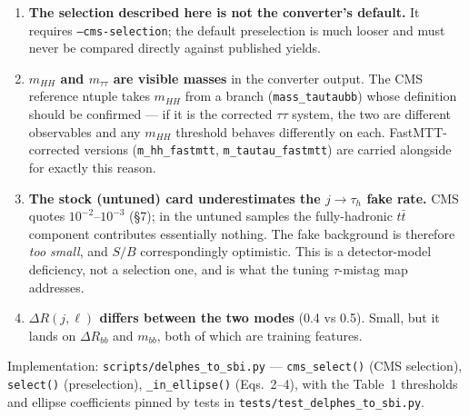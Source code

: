 \documentclass[11pt,a4paper]{article}
\newcommand{\tauh}{\tau_{h}}
\newcommand{\mtautau}{m_{\tau\tau}}
\newcommand{\mbb}{m_{bb}}
\newcommand{\mhh}{m_{HH}}
\begin{document}
\begin{enumerate}\itemsep3pt
\item \textbf{The selection described here is not the converter's default.} It requires
  \texttt{--cms-selection}; the default preselection is much looser and must never be
  compared directly against published yields.
\item \textbf{$\mhh$ and $\mtautau$ are visible masses} in the converter output. The CMS
  reference ntuple takes $\mhh$ from a branch (\texttt{mass\_tautaubb}) whose definition
  should be confirmed --- if it is the corrected $\tau\tau$ system, the two are different
  observables and any $\mhh$ threshold behaves differently on each. FastMTT-corrected
  versions (\texttt{m\_hh\_fastmtt}, \texttt{m\_tautau\_fastmtt}) are carried alongside
  for exactly this reason.
\item \textbf{The stock (untuned) card underestimates the $j\rightarrow\tauh$ fake rate.}
  CMS quotes $10^{-2}$--$10^{-3}$ (\S7); in the untuned samples the fully-hadronic
  $t\bar t$ component contributes essentially nothing. The fake background is therefore
  \emph{too small}, and $S/B$ correspondingly optimistic. This is a detector-model
  deficiency, not a selection one, and is what the tuning $\tau$-mistag map addresses.
\item \textbf{$\Delta R(j,\ell)$ differs between the two modes} (0.4 vs 0.5). Small, but
  it lands on $\Delta R_{bb}$ and $\mbb$, both of which are training features.
\end{enumerate}

\vspace{0.4cm}
\noindent\footnotesize
Implementation: \texttt{scripts/delphes\_to\_sbi.py} ---
\texttt{cms\_select()} (CMS selection), \texttt{select()} (preselection),
\texttt{\_in\_ellipse()} (Eqs.~2--4), with the Table~1 thresholds and ellipse
coefficients pinned by tests in \texttt{tests/test\_delphes\_to\_sbi.py}.
\end{document}
